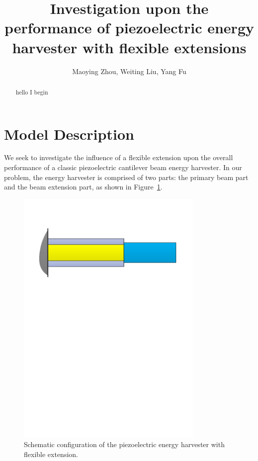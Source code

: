 \documentclass{elsarticle}
\begin{document}
\title{Investigation upon the performance of piezoelectric energy harvester with flexible extensions}
\author{Maoying Zhou, Weiting Liu, Yang Fu}
\maketitle


\begin{abstract}
    hello I begin
\end{abstract}

\section{Model Description}

We seek to investigate the influence of a flexible extension upon the overall performance of a classic piezoelectric cantilever beam energy harvester. In our problem, the energy harvester is comprised of two parts: the primary beam part and the beam extension part, as shown in Figure~\ref{fig:fig_beam_configuration}.
\begin{figure}[!htbp]
    \centering
    \includegraphics[width=0.8\textwidth]{./fig_beam_configuration.pdf}
    \caption{Schematic configuration of the piezoelectric energy harvester with flexible extension.}
    \label{fig:fig_beam_configuration}
\end{figure}
\end{document}
